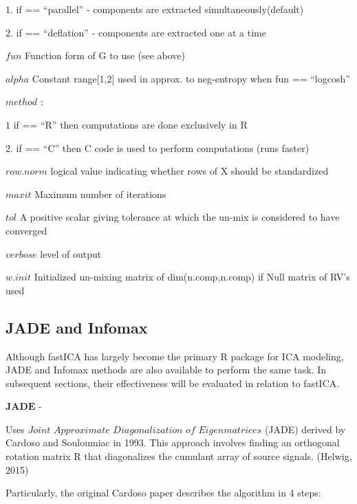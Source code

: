 \documentclass[12pt,twoside]{amherstthesis}
\begin{document}
  \(1.\) if == ``parallel'' - components are extracted
  simultaneously(default)
  
  \(2.\) if == ``deflation'' - components are extracted one at a time
  \newline
  
  \(fun\) Function form of G to use (see above)
  
  \(alpha\) Constant range{[}1,2{]} used in approx. to neg-entropy when
  fun == ``logcosh''
  
  \(method\) : \newline
  
  \(1\) if == ``R'' then computations are done exclusively in R
  
  \(2.\) if == ``C'' then C code is used to perform computations (runs
  faster) \newline
  
  \(row.norm\) logical value indicating whether rows of X should be
  standardized
  
  \(maxit\) Maximum number of iterations
  
  \(tol\) A positive scalar giving tolerance at which the un-mix is
  considered to have converged
  
  \(verbose\) level of output
  
  \(w.init\) Initialized un-mixing matrix of dim(n.comp,n.comp) if Null
  matrix of RV's used
  
  \subsection{JADE and Infomax}\label{jade-and-infomax}
  
  Although fastICA has largely become the primary R package for ICA
  modeling, JADE and Infomax methods are also available to perform the
  same task. In subsequent sections, their effectiveness will be evaluated
  in relation to fastICA. \newline
  
  \(\textbf{JADE}\) -
  
  Uses \(\textit{Joint Approximate Diagonalization of Eigenmatrices}\)
  (JADE) derived by Cardoso and Souloumiac in 1993. This approach involves
  finding an orthogonal rotation matrix R that diagonalizes the cumulant
  array of source signals. (Helwig, 2015) \newline
  
  Particularly, the original Cardoso paper describes the algorithm in 4
  steps: \newline
  
\end{document}

